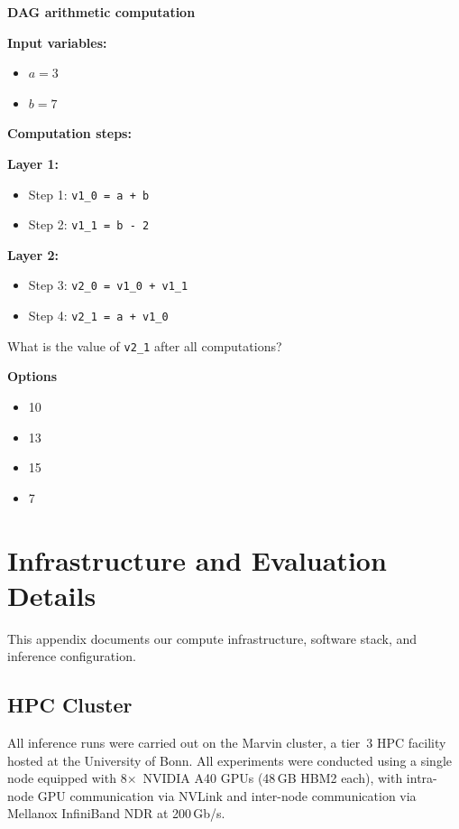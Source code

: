\documentclass[11pt]{article}
\makeatletter
\theoremstyle{definition}
\newif\if@isreview
\newcommand{\redact}[1]{%
  \if@isreview\texttt{[redacted for peer review]}\else#1\fi}
\makeatother
\begin{document}
\begin{tcolorbox}[colback=gray!5!white, colframe=gray!75!black, title=Example Prompt, breakable]
\small
\textbf{DAG arithmetic computation}

\textbf{Input variables:}
\begin{itemize}
  \item $a = 3$
  \item $b = 7$
\end{itemize}

\textbf{Computation steps:}

\textbf{Layer 1:}
\begin{itemize}
  \item Step 1: \texttt{v1\_0 = a + b}
  \item Step 2: \texttt{v1\_1 = b - 2}
\end{itemize}

\textbf{Layer 2:}
\begin{itemize}
  \item Step 3: \texttt{v2\_0 = v1\_0 + v1\_1}
  \item Step 4: \texttt{v2\_1 = a + v1\_0}
\end{itemize}

What is the value of \texttt{v2\_1} after all computations?

\textbf{Options}
\begin{itemize}
  \item[A)] 10
  \item[B)] 13
  \item[C)] 15
  \item[D)] 7
\end{itemize}
\end{tcolorbox}

\section{Infrastructure and Evaluation Details}
\label{appendix:infra-eval-details}
This appendix documents our compute infrastructure, software stack, and inference configuration.

\subsection{HPC Cluster}
\label{appendix:infrastructure-marvin-cluster}
All inference runs were carried out on the \redact{Marvin cluster, a tier~3 HPC facility hosted at the University of Bonn}. All experiments were conducted using a single node equipped with 8$\times$~NVIDIA A40 GPUs (48\,GB HBM2 each), with intra-node GPU communication via NVLink and inter-node communication via Mellanox InfiniBand NDR at 200\,Gb/s.
\end{document}
